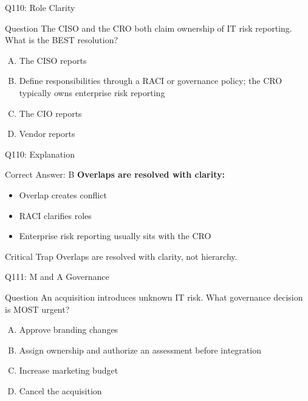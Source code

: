 \documentclass{beamer}
\begin{document}
	\begin{frame}{Q110: Role Clarity}
		\begin{block}{Question}
			The CISO and the CRO both claim ownership of IT risk reporting. What is the BEST resolution?
		\end{block}
		\begin{enumerate}[(A)]
			\item The CISO reports
			\item Define responsibilities through a RACI or governance policy; the CRO typically owns enterprise risk reporting
			\item The CIO reports
			\item Vendor reports
		\end{enumerate}
	\end{frame}
	
	\begin{frame}{Q110: Explanation}
		\begin{block}{Correct Answer: B}
			\textbf{Overlaps are resolved with clarity:}
			\begin{itemize}
				\item Overlap creates conflict
				\item RACI clarifies roles
				\item Enterprise risk reporting usually sits with the CRO
			\end{itemize}
		\end{block}
		\begin{alertblock}{Critical Trap}
			Overlaps are resolved with clarity, not hierarchy.
		\end{alertblock}
	\end{frame}
	
	\begin{frame}{Q111: M and A Governance}
		\begin{block}{Question}
			An acquisition introduces unknown IT risk. What governance decision is MOST urgent?
		\end{block}
		\begin{enumerate}[(A)]
			\item Approve branding changes
			\item Assign ownership and authorize an assessment before integration
			\item Increase marketing budget
			\item Cancel the acquisition
		\end{enumerate}
	\end{frame}
	
\end{document}

